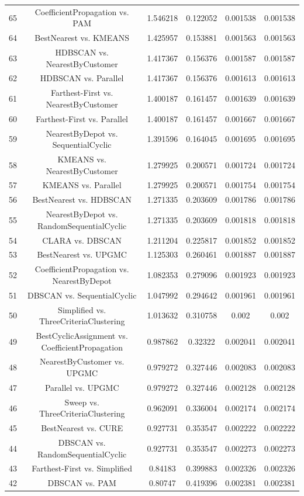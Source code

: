 \documentclass[a4paper,10pt]{article}
\begin{document}
\begin{landscape}
\begin{table}[!htp]
\begin{tabular}{cccccc}
65&CoefficientPropagation vs. PAM&1.546218&0.122052&0.001538&0.001538\\
64&BestNearest vs. KMEANS&1.425957&0.153881&0.001563&0.001563\\
63&HDBSCAN vs. NearestByCustomer&1.417367&0.156376&0.001587&0.001587\\
62&HDBSCAN vs. Parallel&1.417367&0.156376&0.001613&0.001613\\
61&Farthest-First vs. NearestByCustomer&1.400187&0.161457&0.001639&0.001639\\
60&Farthest-First vs. Parallel&1.400187&0.161457&0.001667&0.001667\\
59&NearestByDepot vs. SequentialCyclic&1.391596&0.164045&0.001695&0.001695\\
58&KMEANS vs. NearestByCustomer&1.279925&0.200571&0.001724&0.001724\\
57&KMEANS vs. Parallel&1.279925&0.200571&0.001754&0.001754\\
56&BestNearest vs. HDBSCAN&1.271335&0.203609&0.001786&0.001786\\
55&NearestByDepot vs. RandomSequentialCyclic&1.271335&0.203609&0.001818&0.001818\\
54&CLARA vs. DBSCAN&1.211204&0.225817&0.001852&0.001852\\
53&BestNearest vs. UPGMC&1.125303&0.260461&0.001887&0.001887\\
52&CoefficientPropagation vs. NearestByDepot&1.082353&0.279096&0.001923&0.001923\\
51&DBSCAN vs. SequentialCyclic&1.047992&0.294642&0.001961&0.001961\\
50&Simplified vs. ThreeCriteriaClustering&1.013632&0.310758&0.002&0.002\\
49&BestCyclicAssignment vs. CoefficientPropagation&0.987862&0.32322&0.002041&0.002041\\
48&NearestByCustomer vs. UPGMC&0.979272&0.327446&0.002083&0.002083\\
47&Parallel vs. UPGMC&0.979272&0.327446&0.002128&0.002128\\
46&Sweep vs. ThreeCriteriaClustering&0.962091&0.336004&0.002174&0.002174\\
45&BestNearest vs. CURE&0.927731&0.353547&0.002222&0.002222\\
44&DBSCAN vs. RandomSequentialCyclic&0.927731&0.353547&0.002273&0.002273\\
43&Farthest-First vs. Simplified&0.84183&0.399883&0.002326&0.002326\\
42&DBSCAN vs. PAM&0.80747&0.419396&0.002381&0.002381\\

\end{tabular}
\end{table}
\end{landscape}
\end{document}
